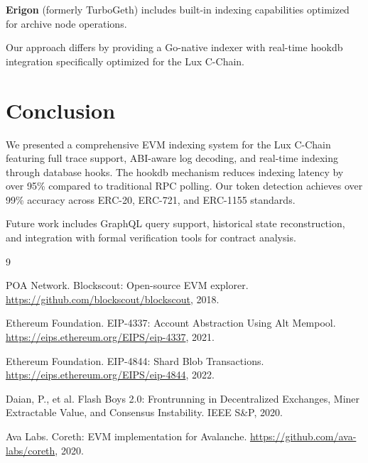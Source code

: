 \documentclass[11pt,twocolumn]{article}
\begin{document}
\textbf{Erigon} (formerly TurboGeth) includes built-in indexing capabilities optimized for archive node operations.

Our approach differs by providing a Go-native indexer with real-time hookdb integration specifically optimized for the Lux C-Chain.

\section{Conclusion}

We presented a comprehensive EVM indexing system for the Lux C-Chain featuring full trace support, ABI-aware log decoding, and real-time indexing through database hooks. The hookdb mechanism reduces indexing latency by over 95\% compared to traditional RPC polling. Our token detection achieves over 99\% accuracy across ERC-20, ERC-721, and ERC-1155 standards.

Future work includes GraphQL query support, historical state reconstruction, and integration with formal verification tools for contract analysis.


\begin{thebibliography}{9}

POA Network. Blockscout: Open-source EVM explorer. \url{https://github.com/blockscout/blockscout}, 2018.

Ethereum Foundation. EIP-4337: Account Abstraction Using Alt Mempool. \url{https://eips.ethereum.org/EIPS/eip-4337}, 2021.

Ethereum Foundation. EIP-4844: Shard Blob Transactions. \url{https://eips.ethereum.org/EIPS/eip-4844}, 2022.

Daian, P., et al. Flash Boys 2.0: Frontrunning in Decentralized Exchanges, Miner Extractable Value, and Consensus Instability. IEEE S\&P, 2020.

Ava Labs. Coreth: EVM implementation for Avalanche. \url{https://github.com/ava-labs/coreth}, 2020.

\end{thebibliography}
\end{document}
